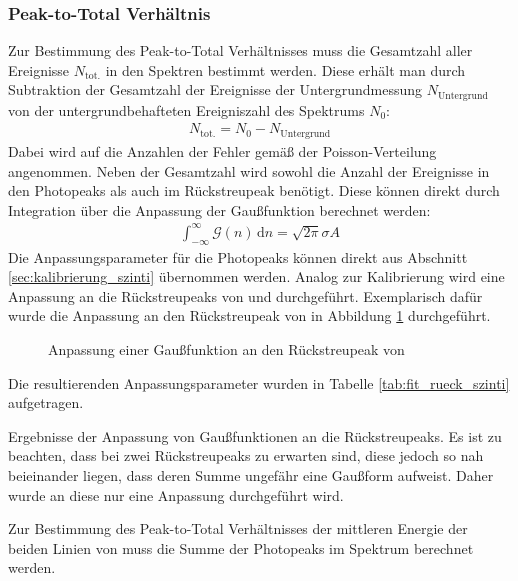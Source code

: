 \documentclass[11pt, a4paper]{article}
\numberwithin{equation}{section}
\newcommand{\co}{\isotope[60]{Co}}
\begin{document}
\subsubsection{Peak-to-Total Verhältnis}
\label{sec:ptt_szinti}
Zur Bestimmung des Peak-to-Total Verhältnisses muss die Gesamtzahl aller Ereignisse $N_\mathrm{tot.}$ in den Spektren bestimmt werden.
Diese erhält man durch Subtraktion der Gesamtzahl der Ereignisse der Untergrundmessung $N_\mathrm{Untergrund}$ von der untergrundbehafteten Ereigniszahl des Spektrums $N_0$:
\begin{align}
	N_\mathrm{tot.} = N_\mathrm{0} - N_\mathrm{Untergrund}
\end{align}
Dabei wird auf die Anzahlen der Fehler gemäß der Poisson-Verteilung angenommen.
Neben der Gesamtzahl wird sowohl die Anzahl der Ereignisse in den Photopeaks als auch im Rückstreupeak benötigt.
Diese können direkt durch Integration über die Anpassung der Gaußfunktion berechnet werden:
\begin{align}
\int_{-\infty}^{\infty} \mathcal{G}(n) \, \mathrm{d}n = \sqrt{2 \pi} \sigma A
\label{eq:integral_peak}
\end{align}
Die Anpassungsparameter für die Photopeaks können direkt aus Abschnitt \ref{sec:kalibrierung_szinti} übernommen werden.
Analog zur Kalibrierung wird eine Anpassung an die Rückstreupeaks von  und  durchgeführt.
Exemplarisch dafür wurde die Anpassung an den Rückstreupeak von  in Abbildung \ref{fig:fit_rueck_szinti} durchgeführt.
\begin{figure}[ht]
	\centering
	
	\caption{Anpassung einer Gaußfunktion an den Rückstreupeak von }
	\label{fig:fit_rueck_szinti}
\end{figure}
Die resultierenden Anpassungsparameter wurden in Tabelle \ref{tab:fit_rueck_szinti} aufgetragen.
\begin{table}[ht]
	\centering
	
	\caption{Ergebnisse der Anpassung von Gaußfunktionen an die Rückstreupeaks. Es ist zu beachten, dass bei \co{} zwei Rückstreupeaks zu erwarten sind, diese jedoch so nah beieinander liegen, dass deren Summe ungefähr eine Gaußform aufweist. Daher wurde an diese nur eine Anpassung durchgeführt wird.}
	\label{tab:fit_rueck_szinti}
\end{table}
Zur Bestimmung des Peak-to-Total Verhältnisses der mittleren Energie der beiden Linien von  muss die Summe der Photopeaks im Spektrum berechnet werden.
\end{document}
